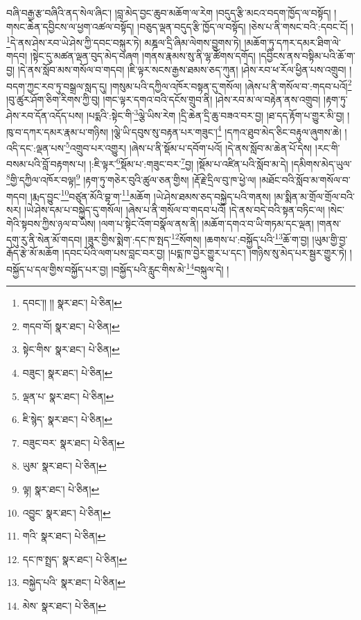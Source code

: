 བཞི་བརྒྱ་རྩ་བཞིའི་ནད་སེལ་ཞིང་། །བླ་མེད་བྱང་ཆུབ་མཆོག་ལ་རེག །བདུད་རྩི་མངའ་བདག་ཁྱོད་ལ་བསྟོད། །གསང་ཆེན་དབྱིངས་ལ་ཕྱག་འཚལ་བསྟོད། །བཅུད་ལྡན་བདུད་རྩི་ཁྱོད་ལ་བསྟོད། །ཅེས་པ་ནི་གསང་བའི་:དབང་ངོ། །\footnote{དབང་།། །།  སྣར་ཐང་།  པེ་ཅིན། }དེ་ནས་ཤེས་རབ་ཡེ་ཤེས་ཀྱི་དབང་བསྐུར་ཏེ། མཎྜལ་དྲི་ཞིམ་ལེགས་བྱུགས་ཏེ། །མཆོག་ཏུ་དཀར་དམར་ཐིག་ལེ་གདབ། །སྟེང་དུ་མཚན་ལྡན་བུད་མེད་བཞག །གནས་རྣམས་སུ་ནི་ལྷ་ཚོགས་དགོད། །དབྱིངས་ནས་བསྟིམ་པའི་ཆོ་ག་བྱ། །དེ་ནས་སློབ་མས་གསོལ་བ་གདབ། །ཇི་ལྟར་སངས་རྒྱས་ཐམས་ཅད་ཀུན། །ཤེས་རབ་ཕ་རོལ་ཕྱིན་པས་འགྲུབ། །བདག་ཀྱང་རབ་ཏུ་བསྒྲལ་སླད་དུ། །གསུམ་པའི་དཀྱིལ་འཁོར་བསྟན་དུ་གསོལ། །ཞེས་པ་ནི་གསོལ་བ་:གདབ་པའོ།\footnote{གདབ་བོ།  སྣར་ཐང་།  པེ་ཅིན། } །བུ་ཚུར་ཤོག་ཅིག་རིགས་ཀྱི་བུ། །གང་ལྟར་དགའ་བའི་དངོས་གྲུབ་ནི། །ཤེས་རབ་མ་ལ་བརྟེན་ནས་འགྲུབ། །རྟག་ཏུ་ཤེས་རབ་དོན་འདོད་པས། །པདྨའི་:སྟེང་གི་\footnote{སྟེང་གིས་  སྣར་ཐང་།  པེ་ཅིན། }ལྕེ་ཡིས་རེག །དྲི་ཆེན་དྲི་ཆུ་བཟའ་བར་བྱ། །ཐ་དད་རྟོག་པ་གྱུར་མི་བྱ། །ཁུ་བ་དཀར་དམར་རྣམ་པ་གཉིས། །ལྕེ་ཡི་དབུས་སུ་བརྟན་པར་གཟུང་།\footnote{བཟུང་།  སྣར་ཐང་།  པེ་ཅིན། } །དཀའ་ཐུབ་མེད་ཅིང་བརྟུལ་ཞུགས་ཆེ། །འདི་དང་:ལྡན་པས་\footnote{ལྡན་པ་  སྣར་ཐང་།  པེ་ཅིན། }འགྲུབ་པར་འགྱུར། །ཞེས་པ་ནི་སྡོམ་པ་དབོག་པའོ། །དེ་ནས་སློབ་མ་ཆེན་པོ་དེས། །རང་གི་བསམ་པའི་བློ་བརྟགས་པ། །:ཇི་ལྟར་\footnote{ཇི་སྙེད་  སྣར་ཐང་།  པེ་ཅིན། }སྡོམ་པ་:གཟུང་བར་\footnote{བཟུང་བར་  སྣར་ཐང་།  པེ་ཅིན། }བྱ། །སྡོམ་པ་འཛིན་པའི་སློབ་མ་དེ། །དམིགས་མེད་ཡུལ་\footnote{ཡུམ་  སྣར་ཐང་།  པེ་ཅིན། }གྱི་དཀྱིལ་འཁོར་བལྟ།\footnote{ལྟ།  སྣར་ཐང་།  པེ་ཅིན། } །རྟག་ཏུ་གཅེར་བུའི་ཚུལ་ཅན་གྱིས། །རྡོ་རྗེ་དྲིལ་བུ་ཁ་ཕྱེ་ལ། །མཐོང་བའི་སློབ་མ་གསོལ་བ་གདབ། །རྨད་བྱུང་\footnote{འབྱུང་  སྣར་ཐང་།  པེ་ཅིན། }བཙུན་མོའི་བྷ་ག་\footnote{གའི་  སྣར་ཐང་།  པེ་ཅིན། }མཆོག །ཡེ་ཤེས་ཐམས་ཅད་བསྐྱེད་པའི་གནས། །མ་སྨིན་མ་གྲོལ་གྲོལ་བའི་སར། །ཡེ་ཤེས་དམ་པ་བསྐྱེད་དུ་གསོལ། །ཞེས་པ་ནི་གསོལ་བ་གདབ་པའོ། །དེ་ནས་བདེ་བའི་སྟན་བཏིང་ལ། །སེང་གེའི་སྟབས་ཀྱིས་ཉལ་བ་ཡིས། །ལག་པ་སྟེང་འོག་བསྣོལ་ནས་ནི། །མཆོག་དགའ་བ་ཡི་གཏམ་དང་ལྡན། །གནས་དགུ་རུ་ནི་སེན་མོ་གདབ། །ཟུར་གྱིས་སྨེག་:དང་ཁ་སྤད་\footnote{དང་ཁ་སྤྲད་  སྣར་ཐང་།  པེ་ཅིན། }སོགས། །ཆགས་པ་:བསྐྱོད་པའི་\footnote{བསྐྱེད་པའི་  སྣར་ཐང་།  པེ་ཅིན། }ཆོ་ག་བྱ། །ཡུམ་གྱི་བྱ་རྒོད་རྩེ་མོ་མཆོག །དབང་པོའི་ལག་པས་བླང་བར་བྱ། །པདྨ་ཁ་བྱེར་གྱུར་པ་དང་། །གཉིས་སུ་མེད་པར་སྦྱར་གྱུར་ཏེ། །བསྐྱོད་པ་དལ་གྱིས་བསྐྱོད་པར་བྱ། །བསྐྱོད་པའི་རླུང་གིས་མེ་\footnote{མེས་  སྣར་ཐང་།  པེ་ཅིན། }བསྐུལ་དེ། །
